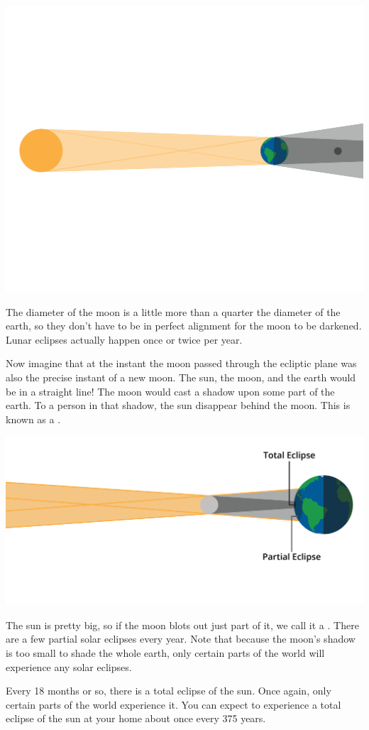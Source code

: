 \includegraphics[width=.75\textwidth]{lunarEclipse.png}

The diameter of the moon is a little more than a quarter the diameter of the earth,  so they don't have to be in perfect alignment for the moon to be darkened.   Lunar eclipses actually happen once or twice per year.

Now imagine that at the instant the moon passed through the ecliptic plane was also the precise instant of a new moon.    The sun,  the moon, and the earth would be in a straight line!  The moon would cast a shadow upon some part of the earth.  To a person in that shadow,  the sun disappear behind the moon.   This is known as a .

\includegraphics[width=.75\textwidth]{eclipseShadows.png}



The sun is pretty big,  so if the moon blots out just part of it,  we call it a .  There are a few partial solar eclipses every year.   Note that because the moon's shadow is too small to shade the whole earth,   only certain parts of the world will experience any solar eclipses. 


Every 18 months or so,  there is a total eclipse of the sun.  Once again,  only certain parts of the world experience it.   You can expect to experience a total eclipse of the sun at your home about once every 375 years.


